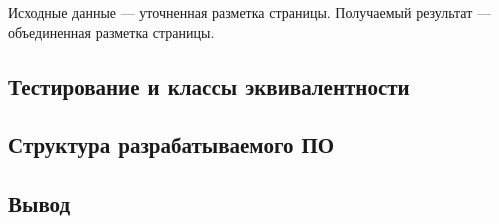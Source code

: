 Исходные данные --- уточненная разметка страницы.
Получаемый результат --- объединенная разметка страницы.




\subsection{Тестирование и классы эквивалентности}

\subsection{Структура разрабатываемого ПО}

\subsection*{Вывод}
